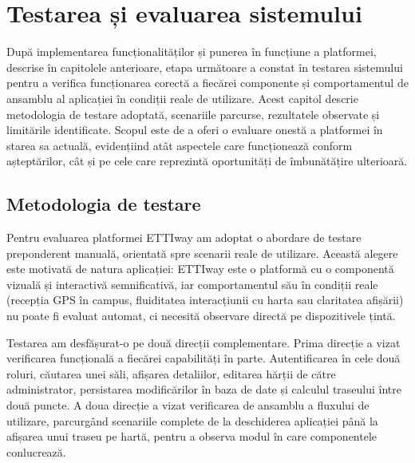 
\chapter{Testarea și evaluarea sistemului}
\label{cap:testare}

După implementarea funcționalităților și punerea în funcțiune a platformei,
descrise în capitolele anterioare, etapa următoare a constat în testarea
sistemului pentru a verifica funcționarea corectă a fiecărei componente și
comportamentul de ansamblu al aplicației în condiții reale de utilizare. Acest
capitol descrie metodologia de testare adoptată, scenariile parcurse, rezultatele
observate și limitările identificate. Scopul este de a oferi o evaluare onestă a
platformei în starea sa actuală, evidențiind atât aspectele care funcționează
conform așteptărilor, cât și pe cele care reprezintă oportunități de îmbunătățire
ulterioară.

\section{Metodologia de testare}
\label{sec:metodologie-testare}

Pentru evaluarea platformei ETTIway am adoptat o abordare de testare
preponderent manuală, orientată spre scenarii reale de utilizare. Această alegere
este motivată de natura aplicației: ETTIway este o platformă cu o componentă
vizuală și interactivă semnificativă, iar comportamentul său în condiții reale
(recepția GPS în campus, fluiditatea interacțiunii cu harta sau
claritatea afișării) nu poate fi evaluat automat, ci necesită observare directă
pe dispozitivele țintă.


Testarea am desfășurat-o pe două direcții complementare. Prima direcție a vizat
verificarea funcțională a fiecărei capabilități în parte. Autentificarea în cele
două roluri, căutarea unei săli, afișarea detaliilor, editarea hărții de către
administrator, persistarea modificărilor în baza de date și calculul traseului
între două puncte. A doua direcție a vizat verificarea de ansamblu a fluxului de
utilizare, parcurgând scenariile complete de la deschiderea aplicației până la
afișarea unui traseu pe hartă, pentru a observa modul în care componentele
conlucrează.


